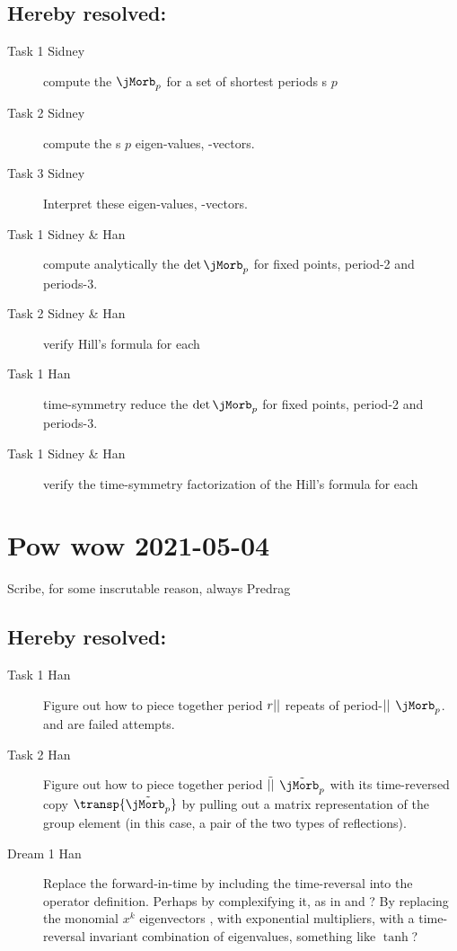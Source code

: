 \subsection{Hereby resolved:}
\begin{description}
\item[Task 1 Sidney]
    compute the {\jacobianOrb} $\jMorb_{p}$ for a set of shortest periods
    {\lattstate}s $p$
\item[Task 2 Sidney]
    compute the {\lattstate}s $p$ {\jacobianOrb} eigen-values, -vectors.
\item[Task 3 Sidney]
    Interpret these eigen-values, -vectors.
\item[Task 1 Sidney \& Han]
    compute analytically the {\jacobianOrb} $\det\jMorb_{p}$ for fixed
    points, period-2 and periods-3.
\item[Task 2 Sidney \& Han]
    verify Hill's formula for each
\item[Task 1 Han]
    time-symmetry reduce the {\jacobianOrb} $\det\jMorb_{p}$ for fixed
    points, period-2 and periods-3.
\item[Task 1 Sidney \& Han]
    verify the time-symmetry factorization of the Hill's formula for each
\end{description}

\section{Pow wow 2021-05-04}
\label{sect:pw2021-05-04}

Scribe, for some inscrutable reason, always Predrag
\medskip
\begin{description}
\end{description}

\subsection{Hereby resolved:}
\begin{description}
\item[Task 1 Han]
    Figure out how to piece together period $r{||}$ repeats of
    period-${||}$  {\jacobianOrb} $\jMorb_{p}$.
     and  are failed
    attempts.
\item[Task 2 Han]
    Figure out how to piece together period $\tilde{{||}}$  $\tilde{\jMorb_{p}}$
    with its time-reversed copy $\transp{\tilde{\jMorb_{p}}}$ by pulling out
    a matrix representation of the group element (in this case, a pair of the
    two types of reflections).
\item[Dream 1 Han]
    Replace the forward-in-time {\FPoper} by including the time-reversal
    into the operator definition. Perhaps by complexifying it, as in
     and
    ?
    By replacing the monomial $x^k$ eigenvectors
    , with exponential
    multipliers, with a time-reversal invariant combination of
    eigenvalues, something like $\tanh$?
\end{description}

